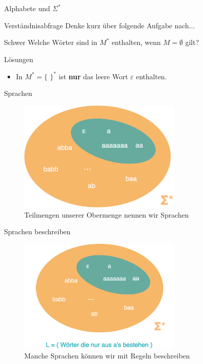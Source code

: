 \documentclass[10pt]{beamer}
\newcommand{\emptyWord}{\varepsilon}
\begin{document}
\begin{frame}[fragile]{Alphabete und $\Sigma^{*}$}
\begin{alertblock}{Verständnisabfrage}
    Denke kurz über folgende Aufgabe nach...
    \end{alertblock}
    
    \begin{block}{Schwer}
        Welche Wörter sind in $M^{*}$ enthalten, wenn $M = \emptyset$ gilt?
    \end{block}
\end{frame}

{
\begin{frame}{Lösungen}
  \begin{itemize}
        \item In $M^{*} = \{$ $ \}^{*}$ ist \textbf{nur} das leere Wort $\emptyWord$ enthalten.
    \end{itemize}
\end{frame}
}

\begin{frame}[fragile]{Sprachen}
\begin{figure}
    \centering
    \includegraphics[width=0.7\textwidth]{figures/MysterySprache.png}
    \caption{Teilmengen unserer Obermenge nennen wir Sprachen}
    \label{fig:my_label}
\end{figure}
\end{frame}

\begin{frame}[fragile]{Sprachen beschreiben}
\begin{figure}
    \centering
    \includegraphics[width=0.7\textwidth]{figures/SprachReveal.png}
    \caption{Manche Sprachen können wir mit Regeln beschreiben}
    \label{fig:my_label}
\end{figure}
\end{frame}
\end{document}
